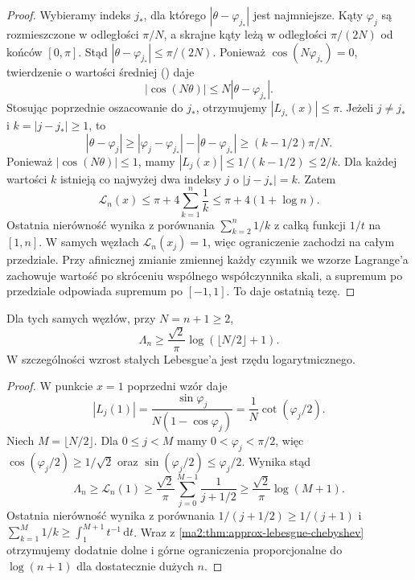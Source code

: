\begin{proof}
Wybieramy indeks $j_*$, dla którego
$|\theta-\varphi_{j_*}|$ jest najmniejsze.
Kąty $\varphi_j$ są rozmieszczone
w odległości $\pi/N$, a skrajne kąty
leżą w odległości $\pi/(2N)$ od końców
$[0,\pi]$. Stąd
$|\theta-\varphi_{j_*}|\le\pi/(2N)$.
Ponieważ $\cos(N\varphi_{j_*})=0$,
twierdzenie o wartości średniej
() daje
\[
 |\cos(N\theta)|\le N|\theta-\varphi_{j_*}|.
\]
Stosując poprzednie oszacowanie do $j_*$,
otrzymujemy $|L_{j_*}(x)|\le\pi$.
Jeżeli $j\ne j_*$ i $k=|j-j_*|\ge1$, to
\[
 |\theta-\varphi_j|\ge
 |\varphi_j-\varphi_{j_*}|
 -|\theta-\varphi_{j_*}|
 \ge(k-1/2)\pi/N.
\]
Ponieważ $|\cos(N\theta)|\le1$,
mamy $|L_j(x)|\le1/(k-1/2)\le2/k$.
Dla każdej wartości $k$ istnieją co najwyżej
dwa indeksy $j$ o $|j-j_*|=k$.
Zatem
\[
 \mathcal L_n(x)\le\pi+4\sum_{k=1}^n\frac1k
 \le\pi+4(1+\log n).
\]
Ostatnia nierówność wynika z porównania
$\sum_{k=2}^n1/k$ z całką funkcji $1/t$
na $[1,n]$.
W samych węzłach $\mathcal L_n(x_j)=1$,
więc ograniczenie zachodzi na całym przedziale.
Przy afinicznej zmianie zmiennej każdy
czynnik we wzorze Lagrange'a zachowuje wartość
po skróceniu wspólnego współczynnika skali,
a supremum po przedziale odpowiada supremum
po $[-1,1]$. To daje ostatnią tezę.
\end{proof}

\begin{stwierdzenie}
\label{ma2:prop:approx-lebesgue-chebyshev-lower}
Dla tych samych węzłów, przy $N=n+1\ge2$,
\[
 \Lambda_n\ge \frac{\sqrt2}{\pi}
 \log(\lfloor N/2\rfloor+1).
\]
W szczególności wzrost stałych Lebesgue'a
jest rzędu logarytmicznego.
\end{stwierdzenie}
\begin{proof}
W punkcie $x=1$ poprzedni wzór daje
\[
 |L_j(1)|=\frac{\sin\varphi_j}
 {N(1-\cos\varphi_j)}
 =\frac1N\cot(\varphi_j/2).
\]
Niech $M=\lfloor N/2\rfloor$. Dla $0\le j<M$
mamy $0<\varphi_j<\pi/2$,
więc $\cos(\varphi_j/2)\ge1/\sqrt2$
oraz $\sin(\varphi_j/2)\le\varphi_j/2$.
Wynika stąd
\[
 \Lambda_n\ge\mathcal L_n(1)\ge
 \frac{\sqrt2}{\pi}\sum_{j=0}^{M-1}
 \frac1{j+1/2}
 \ge \frac{\sqrt2}{\pi}\log(M+1).
\]
Ostatnia nierówność wynika z porównania
$1/(j+1/2)\ge1/(j+1)$ i
$\sum_{k=1}^{M}1/k\ge\int_1^{M+1}t^{-1}\,\mathrm dt$.
Wraz z \ref{ma2:thm:approx-lebesgue-chebyshev}
otrzymujemy dodatnie dolne i górne ograniczenia
proporcjonalne do $\log(n+1)$ dla dostatecznie
dużych $n$.
\end{proof}

